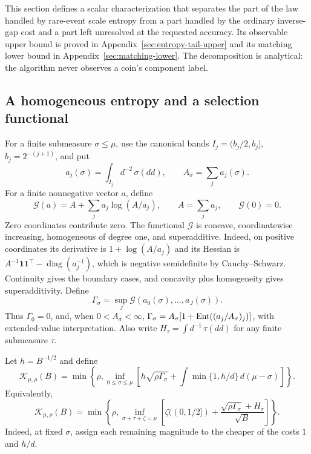 This section defines a scalar characterization that separates the part of
the law handled by rare-event scale entropy from a part handled by the
ordinary inverse-gap cost and a part left unresolved at the requested
accuracy. Its observable upper bound is proved in
Appendix~\ref{sec:entropy-tail-upper} and its matching lower bound in
Appendix~\ref{sec:matching-lower}. The decomposition is analytical:
the algorithm never observes a coin's component label.

\subsection{A homogeneous entropy and a selection functional}

For a finite submeasure $\sigma\le\mu$, use the canonical bands
$I_j=(b_j/2,b_j]$, $b_j=2^{-(j+1)}$, and put
\[
 a_j(\sigma)=\int_{I_j}d^{-2}\,\sigma(dd),\qquad
 A_\sigma=\sum_j a_j(\sigma).
\]
For a finite nonnegative vector $a$, define
\[
 \mathcal G(a)=A+\sum_j a_j\log(A/a_j),\qquad A=\sum_j a_j,
 \qquad \mathcal G(0)=0.
\]
Zero coordinates contribute zero. The functional $\mathcal G$ is concave, coordinatewise increasing,
homogeneous of degree one, and superadditive. Indeed, on positive
coordinates its derivative is $1+\log(A/a_j)$ and its Hessian is
$A^{-1}\mathbf1\mathbf1^\top-\operatorname{diag}(a_j^{-1})$,
which is negative semidefinite by Cauchy--Schwarz. Continuity gives the
boundary cases, and concavity plus homogeneity gives superadditivity. Define
\begin{equation}\label{eq:submeasure-entropy}
 \Gamma_\sigma=\sup_J\mathcal G(a_0(\sigma),\ldots,a_J(\sigma)).
\end{equation}
Thus $\Gamma_0=0$, and, when $0<A_\sigma<\infty$,
$\Gamma_\sigma=A_\sigma[1+\operatorname{Ent}((a_j/A_\sigma)_j)]$, with extended-value
interpretation. Also write
$H_\tau=\int d^{-1}\,\tau(dd)$ for any finite submeasure $\tau$.

Let $h=B^{-1/2}$ and define
\begin{equation}\label{eq:scalar-selection}
 \boxed{\quad
 \mathcal K_{\mu,\rho}(B)=
 \min\left\{\rho,\inf_{0\le\sigma\le\mu}
 \left[h\sqrt{\rho\Gamma_\sigma}
       +\int\min\{1,h/d\}\,d(\mu-\sigma)\right]\right\}.
 \quad}
\end{equation}
Equivalently,
\begin{equation}\label{eq:three-piece-functional}
 \mathcal K_{\mu,\rho}(B)=
 \min\left\{\rho,\inf_{\sigma+\tau+\zeta=\mu}
 \left[\zeta((0,1/2])
       +\frac{\sqrt{\rho\Gamma_\sigma}+H_\tau}{\sqrt B}\right]\right\}.
\end{equation}
Indeed, at fixed $\sigma$, assign each remaining magnitude to the cheaper
of the costs $1$ and $h/d$.

